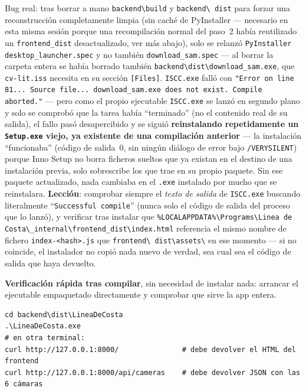 \begin{warnbox}
Bug real: tras borrar a mano \texttt{backend\textbackslash build} y \texttt{backend\textbackslash
dist} para forzar una reconstrucción completamente limpia (sin caché de PyInstaller — necesario en
esta misma sesión porque una recompilación normal del paso~2 había reutilizado un
\texttt{frontend\_dist} desactualizado, ver más abajo), solo se relanzó \texttt{PyInstaller
desktop\_launcher.spec} y no también \texttt{download\_sam.spec} — al borrar la carpeta entera se
había borrado también \texttt{backend\textbackslash dist\textbackslash download\_sam.exe}, que
\texttt{cv-lit.iss} necesita en su sección \texttt{[Files]}. \texttt{ISCC.exe} falló con
\texttt{"Error on line 81... Source file... download\_sam.exe does not exist. Compile aborted."}
— pero como el propio ejecutable \texttt{ISCC.exe} se lanzó en segundo plano y solo se comprobó
que la tarea había ``terminado'' (no el contenido real de su salida), el fallo pasó
desapercibido y se siguió \textbf{reinstalando repetidamente un \texttt{Setup.exe} viejo, ya
existente de una compilación anterior} — la instalación ``funcionaba'' (código de salida~0,
sin ningún diálogo de error bajo \texttt{/VERYSILENT}) porque Inno Setup no borra ficheros
sueltos que ya existan en el destino de una instalación previa, solo sobrescribe los que trae en
su propio paquete. Sin ese paquete actualizado, nada cambiaba en el \texttt{.exe} instalado por
mucho que se reinstalara. \textbf{Lección}: comprobar siempre el \textit{texto de salida} de
\texttt{ISCC.exe} buscando literalmente ``\texttt{Successful compile}'' (nunca solo el código de
salida del proceso que lo lanzó), y verificar tras instalar que
\texttt{\%LOCALAPPDATA\%\textbackslash Programs\textbackslash Linea de
Costa\textbackslash\_internal\textbackslash frontend\_dist\textbackslash index.html} referencia
el mismo nombre de fichero \texttt{index-<hash>.js} que \texttt{frontend\textbackslash
dist\textbackslash assets\textbackslash} en ese momento — si no coincide, el instalador no
copió nada nuevo de verdad, sea cual sea el código de salida que haya devuelto.
\end{warnbox}

\textbf{Verificación rápida tras compilar}, sin necesidad de instalar nada: arrancar el
ejecutable empaquetado directamente y comprobar que sirve la app entera.
\begin{verbatim}
cd backend\dist\LineaDeCosta
.\LineaDeCosta.exe
# en otra terminal:
curl http://127.0.0.1:8000/               # debe devolver el HTML del frontend
curl http://127.0.0.1:8000/api/cameras    # debe devolver JSON con las 6 cámaras
\end{verbatim}

